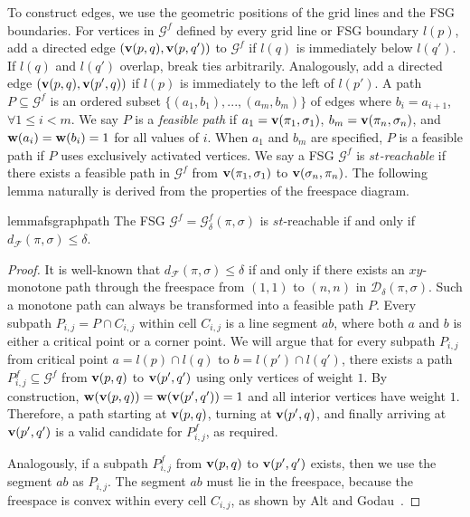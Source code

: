 \documentclass[thm-restate]{lipics-v2021}
\theoremstyle{remark}
\newcommand{\weight}[1]{\normalfont \textbf{w}(#1)}
\newcommand{\graph}[0]{\mathcal{G}}
\newcommand{\df}[1]{d_{\mathcal{F}}(#1)}
\newcommand{\fd}[2]{\mathcal{D}_{#2}(#1)}
\newcommand{\vertex}[1]{\normalfont \textbf{v}(#1)}
\newcommand{\fsgraph}[0]{\graph^{f}}
\newcommand{\cell}[1]{C_{#1}}
\begin{document}
To construct edges, we use the geometric positions of the grid lines and the FSG boundaries. For vertices in $\fsgraph$ defined by every grid line or FSG boundary $l(p)$, add a directed edge $(\vertex{p, q}, \vertex{p, q'})$ to $\fsgraph$ if $l(q)$ is immediately below $l(q')$. If $l(q)$ and $l(q')$ overlap, break ties arbitrarily. Analogously, add a directed edge $(\vertex{p, q}, \vertex{p', q})$ if $l(p)$ is immediately to the left of $l(p')$. A path $P \subseteq \fsgraph$ is an ordered subset $\{(a_1, b_1), ..., (a_m, b_m)\}$ of edges where $b_i = a_{i + 1}$, $\forall 1 \leq i < m$. We say $P$ is a \emph{feasible path} if $a_1 = \vertex{\pi_1, \sigma_1}$, $b_m = \vertex{\pi_n, \sigma_n}$, and $\weight{a_i} = \weight{b_i} = 1$ for all values of $i$. When $a_1$ and $b_m$ are specified, $P$ is a feasible path if $P$ uses exclusively activated vertices. We say a FSG $\fsgraph$ is \emph{$st$-reachable} if there exists a feasible path in $\fsgraph$ from $\vertex{\pi_1, \sigma_1}$ to $\vertex{\sigma_n, \pi_n}$. The following lemma naturally is derived from the properties of the freespace diagram. 
\begin{restatable}{lemma}{fsgraphpath} \label{lem:fsgraph-path}
    The FSG $\fsgraph = \fsgraph_\delta(\pi, \sigma)$ is $st$-reachable if and only if $\df{\pi, \sigma} \leq \delta$. 
\end{restatable}
\begin{proof}
    It is well-known that $\df{\pi, \sigma} \leq \delta$ if and only if there exists an $xy$-monotone path through the freespace from $(1, 1)$ to $(n, n)$ in $\fd{\pi, \sigma}{\delta}$. Such a monotone path can always be transformed into a feasible path $P$. Every subpath $P_{i, j} = P \cap \cell{i, j}$ within cell $\cell{i, j}$ is a line segment $ab$, where both $a$ and $b$ is either a critical point or a corner point. We will argue that for every subpath $P_{i, j}$ from critical point $a = l(p) \cap l(q)$ to $b = l(p') \cap l(q')$, there exists a path $P^{f}_{i, j} \subseteq \fsgraph$ from $\vertex{p, q}$ to $\vertex{p', q'}$ using only vertices of weight $1$. By construction, $\weight{\vertex{p, q}} = \weight{\vertex{p', q'}} = 1$ and all interior vertices have weight $1$. Therefore, a path starting at $\vertex{p, q}$, turning at $\vertex{p', q}$, and finally arriving at $\vertex{p', q'}$ is a valid candidate for $P^{f}_{i, j}$, as required. 

    Analogously, if a subpath $P^{f}_{i, j}$ from $\vertex{p, q}$ to $\vertex{p', q'}$ exists, then we use the segment $ab$ as $P_{i, j}$. The segment $ab$ must lie in the freespace, because the freespace is convex within every cell $\cell{i, j}$, as shown by Alt and Godau~\cite{altComputingFrechetDistance1995}. 
\end{proof}
\end{document}
